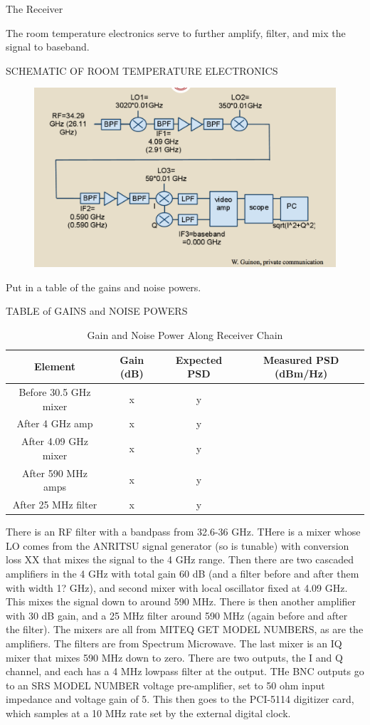 \documentclass[11pt]{article}
\begin{document}
The Receiver

The room temperature electronics serve to further amplify, filter, and mix the signal to baseband. 

SCHEMATIC OF ROOM TEMPERATURE ELECTRONICS
\begin{figure}
\includegraphics[scale=0.3]{receiverdiagram}
\end{figure}

Put in a table of the gains and noise powers.

TABLE of GAINS and NOISE POWERS
\begin{table}[ht]
\caption{Gain and Noise Power Along Receiver Chain}
\begin{tabular}{c c c c}
\hline\hline
Element & Gain (dB) & Expected PSD & Measured PSD (dBm/Hz)\\ [0.5ex]
\hline
Before 30.5 GHz mixer & x & y \\
After 4 GHz amp & x & y \\
After 4.09 GHz mixer & x & y \\
After 590 MHz amps & x & y \\
After 25 MHz filter & x & y \\ [1ex]
\hline
\end{tabular}
\label{table:gainsofreceiverchain}
\end{table}

There is an RF filter with a bandpass from 32.6-36 GHz. THere is a mixer whose LO comes from the ANRITSU signal generator (so is tunable) with conversion loss XX that mixes the signal to the 4 GHz range. Then there are two cascaded amplifiers in the 4 GHz with total gain 60 dB (and a filter before and after them with width 1? GHz), and second mixer with local oscillator fixed at 4.09 GHz. This mixes the signal down to around 590 MHz. There is then another amplifier with 30 dB gain, and a 25 MHz filter around 590 MHz (again before and after the filter). The mixers are all from MITEQ GET MODEL NUMBERS, as are the amplifiers. The filters are from Spectrum Microwave. The last mixer is an IQ mixer that mixes 590 MHz down to zero. There are two outputs, the I and Q channel, and each has a 4 MHz lowpass filter at the output. THe BNC outputs go to an SRS MODEL NUMBER voltage pre-amplifier, set to 50 ohm input impedance and voltage gain of 5. This then goes to the PCI-5114 digitizer card, which samples at a 10 MHz rate set by the external digital clock.
\end{document}
